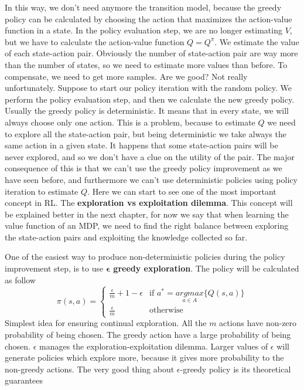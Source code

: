 \documentclass[main.tex]{subfiles}
\begin{document}
In this way, we don't need anymore the transition model, because the greedy policy can be calculated by choosing the action that maximizes the action-value function in a state. In the policy evaluation step, we are no longer estimating $V$, but we have to calculate the action-value function $Q = Q^{\pi}$. We estimate the value of each state-action pair. Obviously the number of state-action pair are way more than the number of states, so we need to estimate more values than before. To compensate, we need to get more samples. Are we good? Not really unfortunately. Suppose to start our policy iteration with the random policy. We perform the policy evaluation step, and then we calculate the new greedy policy. Usually the greedy policy is deterministic. It means that in every state, we will always choose only one action. This is a problem, because to estimate $Q$ we need to explore all the state-action pair, but being deterministic we take always the same action in a given state. It happens that some state-action pairs will be never explored, and so we don't have a clue on the utility of the pair. The major consequence of this is that we can't use the greedy policy improvement as we have seen before, and furthermore we can't use deterministic policies using policy iteration to estimate $Q$. Here we can start to see one of the most important concept in RL. The \textbf{exploration vs exploitation dilemma}. This concept will be explained better in the next chapter, for now we say that when learning the value function of an MDP, we need to find the right balance between exploring the state-action pairs and exploiting the knowledge collected so far.
\par
\noindent
One of the easiest way to produce non-deterministic policies during the policy improvement step, is to use \textbf{$\mathbf{\epsilon}$ greedy exploration}. The policy will be calculated as follow
\begin{equation}
    \pi(s,a) =
    \begin{cases}
        \frac{\epsilon}{m}+1-\epsilon & \text{if }a^*=\underset{a \in A}{argmax} \{ Q(s,a) \} \\
        \frac{\epsilon}{m}            & \text{otherwise}
    \end{cases}
\end{equation}
Simplest idea for ensuring continual exploration. All the $m$ actions have non-zero probability of being chosen. The greedy action have a large probability of being chosen. $\epsilon$ manages the exploration-exploitation dilemma. Larger values of $\epsilon$ will generate policies which explore more, because it gives more probability to the non-greedy actions. The very good thing about $\epsilon$-greedy policy is its theoretical guarantees
\end{document}
